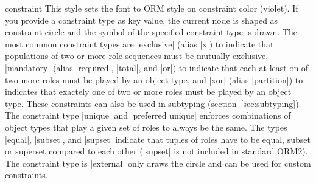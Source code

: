 \documentclass[a4paper,10pt]{article}
\begin{document}
\begin{stylekey}{constraint}
  This style sets the font to ORM style on constraint color (violet). If you provide a constraint type as key value, the current node is shaped as constraint circle and the symbol of the specified constraint type is drawn. The most common constraint types are |exclusive| (alias |x|) to indicate that populations of two or more role-sequences must be mutually exclusive, |mandatory| (alias |required|, |total|, and |or|) to indicate that each at least on of two more roles must be played by an object type, and |xor| (alias |partition|) to indicates that exactely one of two or more roles must be played by an object type. These constraints can also be used in subtyping (section~\ref{sec:subtyping}). The constraint type |unique| and |preferred unique| enforces combinations of object types that play a given set of roles to always be the same. The types |equal|, |subset|, and |supset| indicate that tuples of roles have to be equal, subset or superset compared to each other (|supset| is not included in standard ORM2). The constraint type is |external| only draws the circle and can be used for custom constraints.
\begin{codeexample}[]
\end{codeexample}
\end{stylekey}
\end{document}
